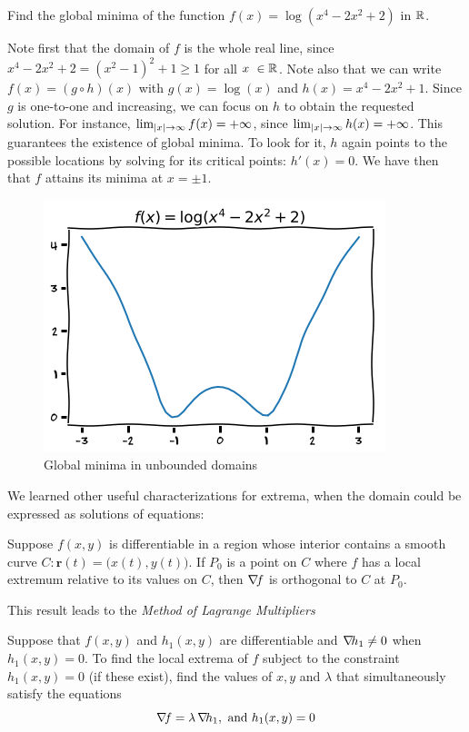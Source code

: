 \begin{example}
Find the global minima of the function $f(x)= \log (x^4-2x^2+2)$ in $\mathbb{R}$.  

Note first that the domain of $f$ is the whole real line, since $x^4-2x^2+2 = (x^2-1)^2+1 \geq 1$ for all $x\ \in \mathbb{R}$.  Note also that we can write $f(x) = (g \circ h)(x)$ with $g(x) = \log(x)$ and $h(x)=x^4-2x^2+1$.  Since $g$ is one-to-one and increasing, we can focus on $h$ to obtain the requested solution.  For instance, $\lim_{\lvert x \rvert\to\infty}f(x) = +\infty$, since $\lim_{\lvert x \rvert\to\infty} h(x) = +\infty$. This guarantees the existence of global minima.  To look for it, $h$ again points to the possible locations by solving for its critical points: $h'(x)=0$.  We have then that $f$ attains its minima at $x=\pm 1$.
\begin{figure}[ht!]
\begin{center}
\includegraphics[width=0.5\linewidth]{images/coercivelog.png}
\end{center}
\caption{Global minima in unbounded domains}
\label{figure:coercivelog}
\end{figure}
\end{example}

We learned other useful characterizations for extrema, when the domain could be expressed as solutions of equations:

\begin{theorem}\label{theorem:OrthogonalGradient}
Suppose $f(x,y)$ is differentiable in a region whose interior contains a smooth curve $C\colon \boldsymbol{r}(t) = \big( x(t), y(t) \big)$.  If $P_0$ is a point on $C$ where $f$ has a local extremum relative to its values on $C$, then $\mathop{\nabla\! {f}}$ is orthogonal to $C$ at $P_0$.
\end{theorem}

This result leads to the \emph{Method of Lagrange Multipliers}

\begin{theorem}\label{theorem:LM1C}
Suppose that $f(x,y)$ and $h_1(x,y)$ are differentiable and $\mathop{\nabla\! {h_1}} \neq 0$ when $h_1(x,y)=0$.  To find the local extrema of $f$ subject to the constraint $h_1(x,y)=0$ (if these exist), find the values of $x,y$ and $\lambda$ that simultaneously satisfy the equations
\begin{equation*}
\mathop{\nabla\! {f}} = \lambda \mathop{\nabla\! {h_1}}, \text{ and }h_1(x,y)=0
\end{equation*}
\end{theorem}

